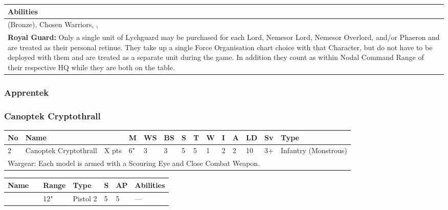 \noindent
\begin{tabular}{||m{532pt}||}
	\hline
	Abilities \\
	\hline
	\quickref{Awakening Protocols} (Bronze), Chosen Warriors, \quickref{Living Metal}, \quickref{Reanimation Protocols} \\
	\textbf{Royal Guard:} Only a single unit of Lychguard may be purchased for each Lord, Nemesor Lord, Nemesor Overlord, and/or Phaeron and are treated as their personal retinue. They take up a single Force Organisation chart choice with that Character, but do not have to be deployed with them and are treated as a separate unit during the game. In addition they count as within Nodal Command Range of their respective HQ while they are both on the table. \\
	\hline
\end{tabular}


\newpage
\subsubsection{Apprentek}



\newpage
\subsubsection{Canoptek Cryptothrall}

\noindent
\begin{tabular}{||m{10pt} m{95pt} m{30pt} m{11pt} m{11pt} m{11pt} m{11pt} m{11pt} m{11pt} m{11pt} m{11pt} m{11pt} m{11pt} m{125pt}||}
	\hline
	No & Name & & M & WS & BS & S & T & W & I & A & LD & Sv & Type \\
	\hline
	2 & Canoptek Cryptothrall & X pts & 6" & 3 & 3 & 5 & 5 & 1 & 2 & 2 & 10 & 3+ & Infantry (Monstrous) \\
	\hline
	\hline
	\multicolumn{14}{||Z{532 pt}||}{Wargear: Each model is armed with a Scouring Eye and Close Combat Weapon.} \\
	\hline
\end{tabular}

\noindent
\begin{tabular}{||m{110pt} m{30pt} m{31pt} m{55pt} m{12pt} m{12pt} m{210pt}||}
	\hline
	Name & & Range & Type & S & AP & Abilities \\
	\hline
	\quickref{Scouring Eye} & & 12" & Pistol 2 & 5 & 5 & — \\
	\hline
\end{tabular}

